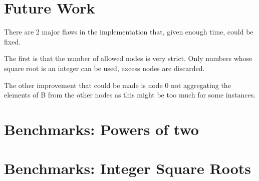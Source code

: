 \documentclass[a4paper]{article}
\begin{document}
\section{Future Work}
There are 2 major flaws in the implementation that, given enough time, could be fixed.

The first is that the number of allowed nodes is very strict. Only numbers whose square
root is an integer can be used, excess nodes are discarded.

The other improvement that could be made is node 0 not aggregating the elements of B from
the other nodes as this might be too much for some instances.

\begin{appendices}
\section{Benchmarks: Powers of two}\label{app:bench1}





\section{Benchmarks: Integer Square Roots}\label{app:bench1}





\end{appendices}
\newpage
\end{document}
